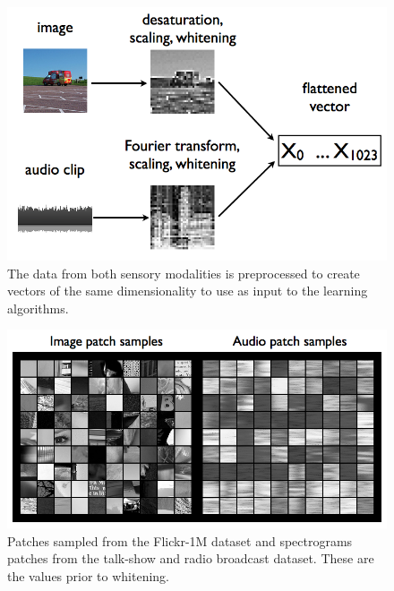 \documentclass[12pt]{article}
\begin{document}
\begin{doublespacing}
\begin{figure}[p]
\centering
\includegraphics[width=6in]{key1002}
\caption{The data from both sensory modalities is preprocessed to create vectors of the same dimensionality to use as input to the learning algorithms.}
\end{figure}

\begin{figure}[p]
\centering
\includegraphics[width=6in]{patch_samples}
\caption{Patches sampled from the Flickr-1M dataset and spectrograms patches from the talk-show and radio broadcast dataset. These are the values prior to whitening.}
\label{fig:bothpatches}
\end{figure}
	

\end{doublespacing}
\end{document}

